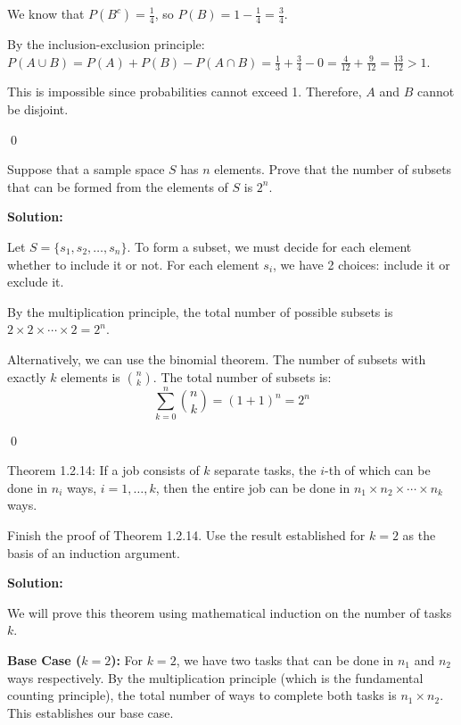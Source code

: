 We know that $P(B^c) = \frac{1}{4}$, so $P(B) = 1 - \frac{1}{4} = \frac{3}{4}$.

By the inclusion-exclusion principle: $P(A \cup B) = P(A) + P(B) - P(A \cap B) = \frac{1}{3} + \frac{3}{4} - 0 = \frac{4}{12} + \frac{9}{12} = \frac{13}{12} > 1$.

This is impossible since probabilities cannot exceed 1. Therefore, $A$ and $B$ cannot be disjoint.



\qed
\begin{problembox}
Suppose that a sample space $S$ has $n$ elements. Prove that the number of subsets that can be formed from the elements of $S$ is $2^n$.
\end{problembox}

\noindent\textbf{Solution:}

Let $S = \{s_1, s_2, \ldots, s_n\}$. To form a subset, we must decide for each element whether to include it or not. For each element $s_i$, we have 2 choices: include it or exclude it.

By the multiplication principle, the total number of possible subsets is $2 \times 2 \times \cdots \times 2 = 2^n$.

Alternatively, we can use the binomial theorem. The number of subsets with exactly $k$ elements is $\binom{n}{k}$. The total number of subsets is:
\[ \sum_{k=0}^{n} \binom{n}{k} = (1 + 1)^n = 2^n \]



\qed
\begin{problembox}
Theorem 1.2.14: If a job consists of $k$ separate tasks, the $i$-th of which can be done in $n_{i}$ ways, $i=1,\ldots,k$, then the entire job can be done in $n_{1} \times n_{2} \times \cdots \times n_{k}$ ways.

Finish the proof of Theorem 1.2.14. Use the result established for $k = 2$ as the basis of an induction argument.

\end{problembox}

\noindent\textbf{Solution:}

We will prove this theorem using mathematical induction on the number of tasks $k$.

\textbf{Base Case ($k = 2$):} 
For $k = 2$, we have two tasks that can be done in $n_1$ and $n_2$ ways respectively. By the multiplication principle (which is the fundamental counting principle), the total number of ways to complete both tasks is $n_1 \times n_2$. This establishes our base case.

